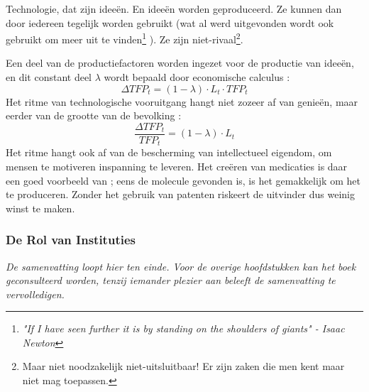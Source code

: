 \par Technologie, dat zijn idee\"en. En idee\"en worden geproduceerd. Ze kunnen dan door iedereen tegelijk worden gebruikt (wat al werd uitgevonden wordt ook gebruikt om meer uit te vinden\footnote{\textit{"If I have seen further it is by standing on the shoulders of giants" - Isaac Newton}} ). Ze zijn niet-rivaal\footnote{Maar niet noodzakelijk niet-uitsluitbaar! Er zijn zaken die men kent maar niet mag toepassen.}.
\par Een deel van de productiefactoren worden ingezet voor de productie van idee\"en, en dit constant deel $\lambda$ wordt bepaald door economische calculus :
$$\Delta TFP_t=(1-\lambda)\cdot L_t\cdot TFP_t$$
Het ritme van technologische vooruitgang hangt niet zozeer af van genie\"en, maar eerder van de grootte van de bevolking :
$$\frac{\Delta TFP_t}{TFP_t}=(1-\lambda)\cdot L_t$$
Het ritme hangt ook af van de bescherming van intellectueel eigendom, om mensen te motiveren inspanning te leveren. Het cre\"eren van medicaties is daar een goed voorbeeld van ; eens de molecule gevonden is, is het gemakkelijk om het te produceren. Zonder het gebruik van patenten riskeert de uitvinder dus weinig winst te maken.

\subsubsection{De Rol van Instituties}

\begin{center}
\textit{De samenvatting loopt hier ten einde. Voor de overige hoofdstukken kan het boek geconsulteerd worden, tenzij iemander plezier aan beleeft de samenvatting te vervolledigen.}
\end{center}














